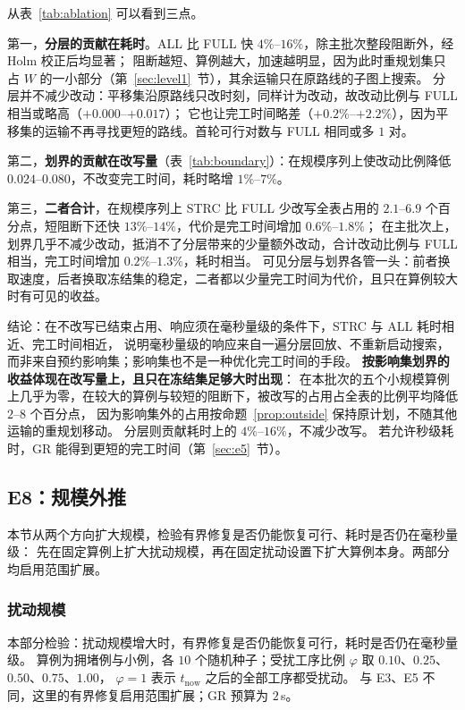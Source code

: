\documentclass[manuscript,screen,review]{acmart}
\providecommand{\STRC}{\textsc{STRC}}
\newcommand{\NSeeds}{10}
\begin{document}
从表~\ref{tab:ablation} 可以看到三点。

第一，\textbf{分层的贡献在耗时}。ALL 比 FULL 快 \(4\%\)--\(16\%\)，除主批次整段阻断外，经 Holm 校正后均显著；
阻断越短、算例越大，加速越明显，因为此时重规划集只占 \(W\) 的一小部分（第~\ref{sec:level1}~节），其余运输只在原路线的子图上搜索。
分层并不减少改动：平移集沿原路线只改时刻，同样计为改动，故改动比例与 FULL 相当或略高（\(+0.000\)--\(+0.017\)）；
它也让完工时间略差（\(+0.2\%\)--\(+2.2\%\)），因为平移集的运输不再寻找更短的路线。首轮可行对数与 FULL 相同或多 \(1\) 对。

第二，\textbf{划界的贡献在改写量}（表~\ref{tab:boundary}）：在规模序列上使改动比例降低 \(0.024\)--\(0.080\)，不改变完工时间，耗时略增 \(1\%\)--\(7\%\)。

第三，\textbf{二者合计}，在规模序列上 \STRC{} 比 FULL 少改写全表占用的 \(2.1\)--\(6.9\) 个百分点，短阻断下还快 \(13\%\)--\(14\%\)，代价是完工时间增加 \(0.6\%\)--\(1.8\%\)；
在主批次上，划界几乎不减少改动，抵消不了分层带来的少量额外改动，合计改动比例与 FULL 相当，完工时间增加 \(0.2\%\)--\(1.3\%\)，耗时相当。
可见分层与划界各管一头：前者换取速度，后者换取冻结集的稳定，二者都以少量完工时间为代价，且只在算例较大时有可见的收益。

结论：在不改写已结束占用、响应须在毫秒量级的条件下，\STRC{} 与 ALL 耗时相近、完工时间相近，
说明毫秒量级的响应来自一遍分层回放、不重新启动搜索，而非来自预约影响集；影响集也不是一种优化完工时间的手段。
\textbf{按影响集划界的收益体现在改写量上，且只在冻结集足够大时出现}：
在本批次的五个小规模算例上几乎为零，在较大的算例与较短的阻断下，被改写的占用占全表的比例平均降低 \(2\)--\(8\) 个百分点，
因为影响集外的占用按命题~\ref{prop:outside} 保持原计划，不随其他运输的重规划移动。
分层则贡献耗时上的 \(4\%\)--\(16\%\)，不减少改写。
若允许秒级耗时，GR 能得到更短的完工时间（第~\ref{sec:e5}~节）。

\subsection{E8：规模外推}
\label{sec:e8}

本节从两个方向扩大规模，检验有界修复是否仍能恢复可行、耗时是否仍在毫秒量级：
先在固定算例上扩大扰动规模，再在固定扰动设置下扩大算例本身。两部分均启用范围扩展。

\subsubsection{扰动规模}
\label{sec:scale}

本部分检验：扰动规模增大时，有界修复是否仍能恢复可行，耗时是否仍在毫秒量级。
算例为拥堵例与小例，各 \(\NSeeds\) 个随机种子；受扰工序比例 \(\varphi\) 取 \(0.10\)、\(0.25\)、\(0.50\)、\(0.75\)、\(1.00\)，
\(\varphi=1\) 表示 \(t_{\mathrm{now}}\) 之后的全部工序都受扰动。
与 E3、E5 不同，这里的有界修复启用范围扩展；GR 预算为 \(2\)\,s。
\end{document}
